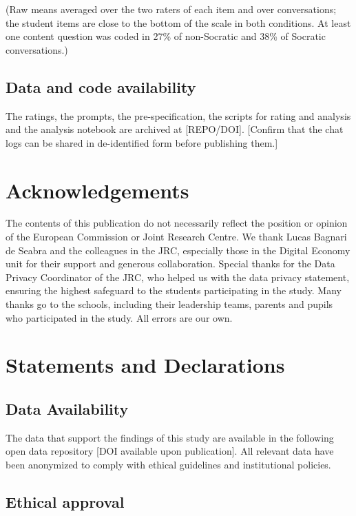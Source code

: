 \documentclass[
  12pt,
]{article}
\begin{document}
(Raw means averaged over the two raters of each item and over conversations; the student items are close to the bottom of the scale in both conditions. At least one content question was coded in 27\% of non-Socratic and 38\% of Socratic conversations.)

\subsection{Data and code availability}\label{data-and-code-availability}

The ratings, the prompts, the pre-specification, the scripts for rating and analysis and the analysis notebook are archived at {[}REPO/DOI{]}. {[}Confirm that the chat logs can be shared in de-identified form before publishing them.{]}

\section{Acknowledgements}\label{acknowledgements}

The contents of this publication do not necessarily reflect the position or opinion of the European Commission or Joint Research Centre. We thank Lucas Bagnari de Seabra and the colleagues in the JRC, especially those in the Digital Economy unit for their support and generous collaboration. Special thanks for the Data Privacy Coordinator of the JRC, who helped us with the data privacy statement, ensuring the highest safeguard to the students participating in the study. Many thanks go to the schools, including their leadership teams, parents and pupils who participated in the study. All errors are our own.

\section{Statements and Declarations}\label{statements-and-declarations}

\subsection{Data Availability}\label{data-availability}

The data that support the findings of this study are available in the following open data repository {[}DOI available upon publication{]}. All relevant data have been anonymized to comply with ethical guidelines and institutional policies.

\subsection{Ethical approval}\label{ethical-approval}
\end{document}

